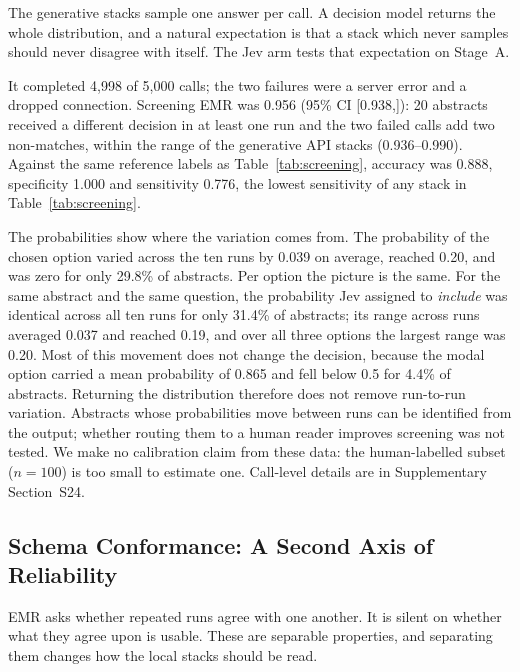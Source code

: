 \documentclass[preprint,review,12pt,authoryear]{elsarticle}
\newcommand{\ci}[2]{[#1,\;#2]}
\begin{document}
The generative stacks sample one answer per call. A decision model returns the whole distribution, and a natural expectation is that a stack which never samples should never disagree with itself. The Jev arm tests that expectation on Stage~A.

It completed 4{,}998 of 5{,}000 calls; the two failures were a server error and a dropped connection. Screening EMR was 0.956 (95\% CI \ci{0.938}{0.972}): 20 abstracts received a different decision in at least one run and the two failed calls add two non-matches, within the range of the generative API stacks (0.936--0.990). Against the same reference labels as Table~\ref{tab:screening}, accuracy was 0.888, specificity 1.000 and sensitivity 0.776, the lowest sensitivity of any stack in Table~\ref{tab:screening}.

The probabilities show where the variation comes from. The probability of the chosen option varied across the ten runs by 0.039 on average, reached 0.20, and was zero for only 29.8\% of abstracts. Per option the picture is the same. For the same abstract and the same question, the probability Jev assigned to \emph{include} was identical across all ten runs for only 31.4\% of abstracts; its range across runs averaged 0.037 and reached 0.19, and over all three options the largest range was 0.20. Most of this movement does not change the decision, because the modal option carried a mean probability of 0.865 and fell below 0.5 for 4.4\% of abstracts. Returning the distribution therefore does not remove run-to-run variation. Abstracts whose probabilities move between runs can be identified from the output; whether routing them to a human reader improves screening was not tested. We make no calibration claim from these data: the human-labelled subset ($n{=}100$) is too small to estimate one. Call-level details are in Supplementary Section~S24.

\subsection{Schema Conformance: A Second Axis of Reliability}
\label{sec:conformance}

EMR asks whether repeated runs agree with one another. It is silent on whether what they agree upon is usable. These are separable properties, and separating them changes how the local stacks should be read.
\end{document}
